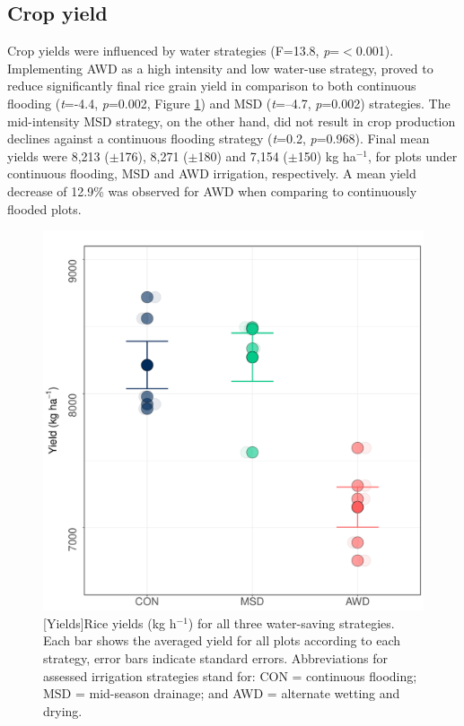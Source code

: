 \subsection{Crop yield} 

Crop yields were influenced by water strategies (F=13.8, \textit{p}=$<$0.001). Implementing AWD as a high intensity and low water-use strategy, proved to reduce significantly final rice grain yield in comparison to both continuous flooding (\textit{t}=-4.4, \textit{p}=0.002, Figure \ref{Yields}) and MSD (\textit{t}=--4.7, \textit{p}=0.002) strategies. The mid-intensity MSD strategy, on the other hand, did not result in crop production declines against a continuous flooding strategy (\textit{t}=0.2, \textit{p}=0.968). Final mean yields were 8,213 ($\pm$176), 8,271 ($\pm$180) and 7,154 ($\pm$150) kg ha$^{-1}$, for plots under continuous flooding, MSD and AWD irrigation, respectively. A mean yield decrease of 12.9\% was observed for AWD when comparing to continuously flooded plots.

\begin{figure} [ht]
\captionsetup{justification=justified}
	\centering 
	\includegraphics[scale=0.33, center]{Figures/Chapter_1/Prod_2022_plot2.pdf}
	[Yields]{Rice yields (kg h$^{-1}$) for all three water-saving strategies. Each bar shows the averaged yield for all plots according to each strategy, error bars indicate standard errors. Abbreviations for assessed irrigation strategies stand for: CON = continuous flooding; MSD = mid-season drainage; and AWD = alternate wetting and drying.}   
	\label{Yields}
\end{figure}


